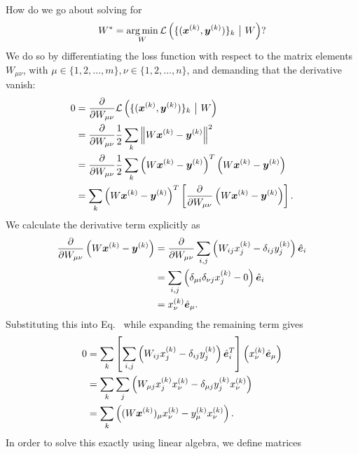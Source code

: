 \vspace{\baselineskip}
How do we go about solving for
%
\begin{equation}
    W^* = \operatorname*{arg\,min}_W \mathcal{L}\left(\{(\bm{x}^{(k)}, \bm{y}^{(k)})\}_k ~\big{|}~ W\right)?
\end{equation}
%
We do so by differentiating the loss function with respect to the matrix elements $W_{\mu\nu}$, with
$\mu \in \{1, 2, \dots, m\}, \nu \in \{1, 2, \dots, n\}$, and demanding that the derivative vanish:
%
\begin{align}
    \label{equation:l2-loss-minimization}
    0 &= \frac{\partial }{\partial W_{\mu\nu}} \mathcal{L}\left(\{(\bm{x}^{(k)}, \bm{y}^{(k)})\}_k ~\big{|}~ W\right) \nonumber\\
      &= \frac{\partial }{\partial W_{\mu\nu}} \frac{1}{2} \sum_k \left\|W \bm{x}^{(k)} - \bm{y}^{(k)} \right\|^2 \nonumber\\
      &= \frac{\partial }{\partial W_{\mu\nu}} \frac{1}{2} \sum_k \left(W \bm{x}^{(k)} - \bm{y}^{(k)} \right)^T \left(W \bm{x}^{(k)} - \bm{y}^{(k)} \right) \nonumber\\
      &= \sum_k \left(W \bm{x}^{(k)} - \bm{y}^{(k)} \right)^T \left[\frac{\partial }{\partial W_{\mu\nu}} \left( W \bm{x}^{(k)} - \bm{y}^{(k)} \right) \right].
\end{align}
%
We calculate the derivative term explicitly as
%
\begin{align}
    \frac{\partial }{\partial W_{\mu\nu}} \left(W \bm{x}^{(k)} - \bm{y}^{(k)} \right) &= \frac{\partial }{\partial W_{\mu\nu}} \sum_{i,j} \left(W_{ij} x^{(k)}_j - \delta_{ij} y^{(k)}_j \right)
                                                                 \hat{\bm{e}}_i \nonumber\\
        &= \sum_{i,j} \left(\delta_{\mu i} \delta_{\nu j} x^{(k)}_j - 0 \right) \hat{\bm{e}}_i \nonumber\\
        &= x^{(k)}_\nu \hat{\bm{e}}_\mu.
\end{align}
%
Substituting this into Eq.~ while expanding the remaining term gives
%
\begin{align}
    \label{equation:l2-loss-minimization-differentiated}
    0 &= \sum_k \left[\sum_{i,j} \left(W_{ij} x^{(k)}_j - \delta_{ij} y^{(k)}_j \right) \hat{\bm{e}}^T_i \right] \left(x^{(k)}_\nu \hat{\bm{e}}_\mu\right) \nonumber\\
      &= \sum_k \sum_{j} \left(W_{\mu j} x^{(k)}_j x^{(k)}_\nu - \delta_{\mu j} y^{(k)}_j x^{(k)}_\nu \right) \nonumber\\
      &= \sum_k \left((W \bm{x}^{(k)})_\mu x^{(k)}_\nu - y^{(k)}_\mu x^{(k)}_\nu \right).
\end{align}
%
In order to solve this exactly using linear algebra, we define matrices
